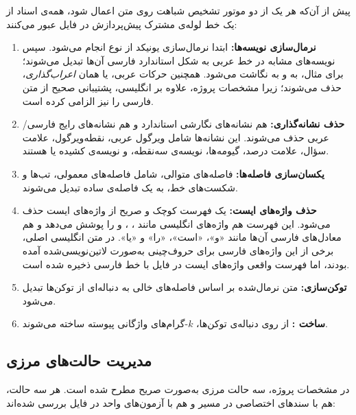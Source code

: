 \documentclass[11pt,a4paper]{article}
\begin{document}
	پیش از آن‌که هر یک از دو موتور تشخیص شباهت روی متن اعمال شود، همه‌ی اسناد از یک خط لوله‌ی مشترک پیش‌پردازش در فایل  عبور می‌کنند:
	
	\begin{enumerate}[label=\arabic*.]
		\item \textbf{نرمال‌سازی نویسه‌ها:}
		ابتدا نرمال‌سازی یونیکد از نوع  انجام می‌شود. سپس نویسه‌های مشابه در خط عربی به شکل استاندارد فارسی آن‌ها تبدیل می‌شوند؛ برای مثال،  به  و  به  نگاشت می‌شود. همچنین حرکات عربی، یا همان \emph{اعراب‌گذاری}، حذف می‌شوند؛ زیرا مشخصات پروژه، علاوه بر انگلیسی، پشتیبانی صحیح از متن فارسی را نیز الزامی کرده است.
		
		\item \textbf{حذف نشانه‌گذاری:}
		هم نشانه‌های نگارشی استاندارد  و هم نشانه‌های رایج فارسی/عربی حذف می‌شوند. این نشانه‌ها شامل ویرگول عربی، نقطه‌ویرگول، علامت سؤال، علامت درصد، گیومه‌ها، نویسه‌ی سه‌نقطه، و نویسه‌ی کشیده یا  هستند.
		
		\item \textbf{یکسان‌سازی فاصله‌ها:}
		فاصله‌های متوالی، شامل فاصله‌های معمولی، تب‌ها و شکست‌های خط، به یک فاصله‌ی ساده تبدیل می‌شوند.
		
		\item \textbf{حذف واژه‌های ایست:}
		یک فهرست کوچک و صریح از واژه‌های ایست حذف می‌شود. این فهرست هم واژه‌های انگلیسی مانند ، ،  و  را پوشش می‌دهد و هم معادل‌های فارسی آن‌ها مانند «و»، «است»، «را» و «یا». در متن انگلیسی اصلی، برخی از این واژه‌های فارسی برای حروف‌چینی به‌صورت لاتین‌نویسی‌شده آمده بودند، اما فهرست واقعی واژه‌های ایست در فایل  با خط فارسی ذخیره شده است.
		
		\item \textbf{توکن‌سازی:}
		متن نرمال‌شده بر اساس فاصله‌های خالی به دنباله‌ای از توکن‌ها تبدیل می‌شود.
		
		\item \textbf{ساخت :}
		از روی دنباله‌ی توکن‌ها، $k$-گرام‌های واژگانی پیوسته ساخته می‌شوند.
	\end{enumerate}
	
	\subsection{مدیریت حالت‌های مرزی}
	
	در مشخصات پروژه، سه حالت مرزی به‌صورت صریح مطرح شده است. هر سه حالت، هم با سندهای اختصاصی در مسیر  و هم با آزمون‌های واحد در فایل  بررسی شده‌اند:
	
\end{document}
